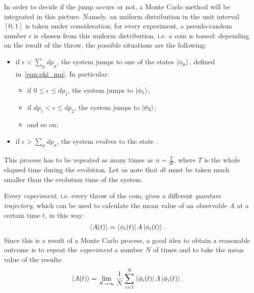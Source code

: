 In order to decide if the jump occurs or not, a Monte Carlo method will be integrated in this picture. Namely, an uniform distribution in the unit interval $[0,1]$ is taken under consideration; for every experiment, a pseudo-random number $\epsilon$ is chosen from this uniform distribution, i.e. a coin is tossed: depending on the result of the throw, the possible situations are the following:
\begin{itemize}
    \item if $\epsilon < \sum_\mu dp_\mu$, the system jumps to one of the states $\ket{\phi_\mu}$, defined in~\ref{eqn:phi_mu}. In particular:
    \begin{itemize}
        \item if $0 \leq \epsilon \leq dp_1$, the system jumps to $\ket{\phi_1}$;
        \item if $dp_1 < \epsilon \leq dp_2$, the system jumps to $\ket{\phi_2}$;
        \item and so on;
    \end{itemize}
    \item if $\epsilon > \sum_\mu dp_\mu$, the system evolves to the state .
\end{itemize}

This process has to be repeated as many times as $n = \frac{T}{dt}$, where $T$ is the whole elapsed time during the evolution. Let us note that $dt$ must be taken much smaller than the evolution time of the system.

Every \emph{experiment}, i.e. every throw of the coin, gives a different \emph{quantum trajectory}, which can be used to calculate the mean value of an observable $A$ at a certain time $t$, in this way:
\begin{equation}
    \langle A(t)\rangle = \bra{\phi_i(t)}A\ket{\phi_i(t)}.
\end{equation}
Since this is a result of a Monte Carlo process, a good idea to obtain a reasonable outcome is to repeat the \emph{experiment} a number $N$ of times and to take the mean value of the results:
\begin{equation}
    \langle A(t)\rangle = \lim_{N\to\infty} \frac{1}{N}\sum_{i=1}^{N}\bra{\phi_i(t)}A\ket{\phi_i(t)}.
\end{equation}


